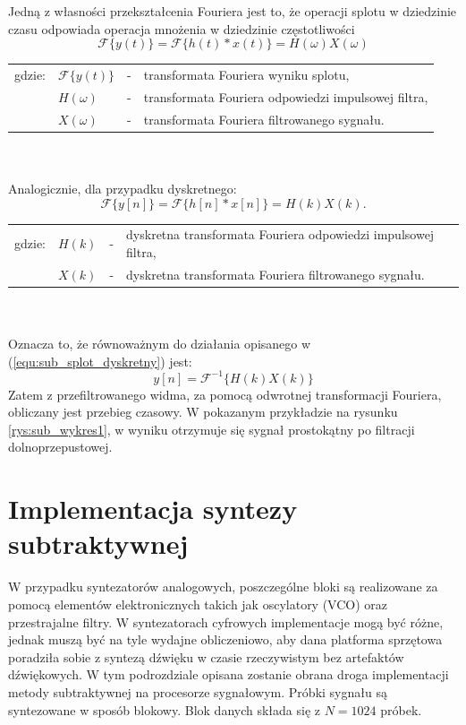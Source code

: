 Jedną z własności przekształcenia Fouriera jest to, że operacji splotu w dziedzinie czasu odpowiada operacja mnożenia w dziedzinie częstotliwości
\begin{equation} \label{equ:sub_splot_twierdzenie}
\mathcal{F}\{y(t)\} = \mathcal{F}\{h(t)*x(t)\} = H(\omega) X(\omega)
\end{equation}
\begin{tabular}{ l l l l}
	gdzie: & $\mathcal{F}\{y(t)\}$ &  - & transformata Fouriera wyniku splotu, \\
	&	$ H(\omega)$ & - &  transformata Fouriera odpowiedzi impulsowej filtra,\\
	&	$X(\omega)$ & - &  transformata Fouriera filtrowanego sygnału.\\
	
\end{tabular} \\ \\
Analogicznie, dla przypadku dyskretnego:
\begin{equation} \label{equ:sub_splot_twierdzenie_dyskretne}
\mathcal{F}\{y[n]\} = \mathcal{F}\{h[n]*x[n]\} = H(k) X(k).
\end{equation}
\begin{tabular}{ l l l l}
	gdzie: & $ H(k)$ & - &  dyskretna transformata Fouriera odpowiedzi impulsowej filtra,\\
	&	$X(k)$ & - &  dyskretna transformata Fouriera filtrowanego sygnału.\\
	
\end{tabular} \\ \\
Oznacza to, że równoważnym do działania opisanego w (\ref{equ:sub_splot_dyskretny}) jest:
\begin{equation} \label{equ:sub_splot_dyskretny2}
y[n] = \mathcal{F}^{-1}\{ H(k) X(k)\} 
\end{equation}
Zatem z przefiltrowanego widma, za pomocą odwrotnej transformacji Fouriera, obliczany jest przebieg czasowy. W pokazanym przykładzie na rysunku \ref{rys:sub_wykres1}, w wyniku otrzymuje się sygnał prostokątny po filtracji dolnoprzepustowej.
\section{Implementacja syntezy subtraktywnej}
W przypadku syntezatorów analogowych, poszczególne bloki są realizowane za pomocą elementów elektronicznych takich jak oscylatory (VCO) oraz przestrajalne filtry. W syntezatorach cyfrowych implementacje mogą być różne, jednak muszą być na tyle wydajne obliczeniowo, aby dana platforma sprzętowa poradziła sobie z syntezą dźwięku w czasie rzeczywistym bez artefaktów dźwiękowych. W tym podrozdziale opisana zostanie obrana droga implementacji metody subtraktywnej na procesorze sygnałowym. 
Próbki sygnału są syntezowane w sposób blokowy. Blok danych składa się z $N=1024$ próbek.



